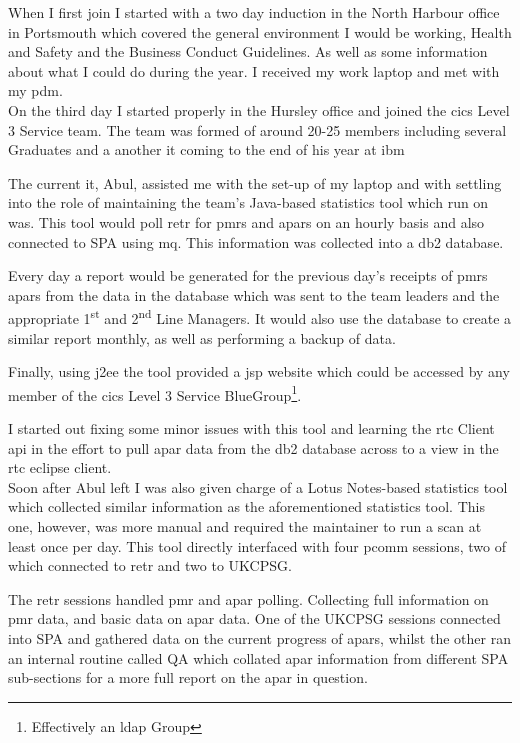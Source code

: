 \documentclass[a4paper,11pt]{report}
\begin{document}
When I first join I started with a two day induction in the North Harbour office in Portsmouth 
which covered the general environment I would be working, Health and Safety and the Business 
Conduct Guidelines. As well as some information about what I could do during the year. I received
my work laptop and met with my \gls{pdm}. \\



On the third day I started properly in the Hursley office and joined the \gls{cics} Level 3 Service
team. The team was formed of around 20-25 members including several Graduates and a another 
\gls{it} coming to the end of his year at \gls{ibm}

The current \gls{it}, Abul, assisted me with the set-up of my laptop and with settling into the 
role of maintaining the team's Java-based statistics tool which run on \gls{was}. This tool would 
poll \gls{retr} for \gls{pmr}s and \gls{apar}s on an hourly basis and also connected to SPA using 
\gls{mq}. This information was collected into a \gls{db2} database.

Every day a report would be generated for the previous day's receipts of \gls{pmr}s \gls{apar}s 
from the data in the database which was sent to the team leaders and the appropriate 
1\textsuperscript{st} and 2\textsuperscript{nd} Line Managers. It would also use the database to
create a similar report monthly, as well as performing a backup of data.

Finally, using \gls{j2ee} the tool provided a \gls{jsp} website which could be accessed by any 
member of the \gls{cics} Level 3 Service BlueGroup\footnote{Effectively an \gls{ldap} Group}.

I started out fixing some minor issues with this tool and learning the \gls{rtc} Client \gls{api}
in the effort to pull \gls{apar} data from the \gls{db2} database across to a view in the \gls{rtc}
eclipse client. \\



Soon after Abul left I was also given charge of a Lotus Notes-based statistics tool which collected
similar information as the aforementioned statistics tool. This one, however, was more manual and
required the maintainer to run a scan at least once per day. This tool directly interfaced with 
four \gls{pcomm} sessions, two of which connected to \gls{retr} and two to UKCPSG.

The \gls{retr} sessions handled \gls{pmr} and \gls{apar} polling. Collecting full information on
\gls{pmr} data, and basic data on \gls{apar} data. One of the UKCPSG sessions connected into SPA 
and gathered data on the current progress of \gls{apar}s, whilst the other ran an internal routine 
called QA which collated \gls{apar} information from different SPA sub-sections for a more full
report on the \gls{apar} in question. \\
\end{document}
